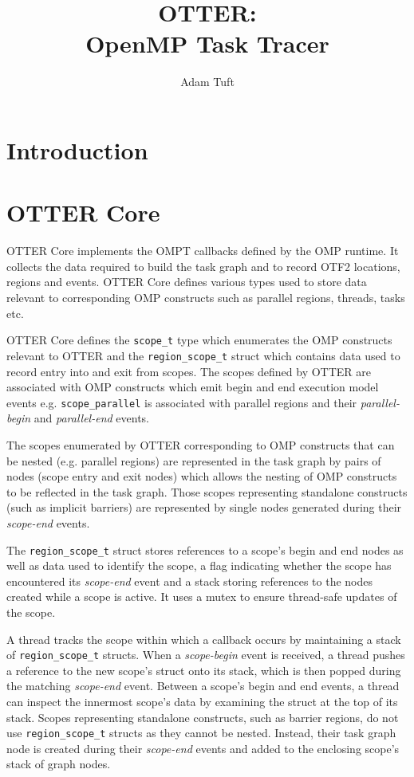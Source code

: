 \documentclass[11pt,a4paper]{article}
\title{OTTER:\\OpenMP Task Tracer}
\newcommand{\code}[1]{\texttt{#1} }
\begin{document}
\author{Adam Tuft}
\maketitle

\section{Introduction}

\section{OTTER Core}

OTTER Core implements the OMPT callbacks defined by the OMP runtime. It collects the data required to build the task graph and to record OTF2 locations, regions and events. OTTER Core defines various types used to store data relevant to corresponding OMP constructs such as parallel regions, threads, tasks etc.

OTTER Core defines the \code{scope\_t} type which enumerates the OMP constructs relevant to OTTER and the \code{region\_scope\_t} struct which contains data used to record entry into and exit from scopes. The scopes defined by OTTER are associated with OMP constructs which emit begin and end execution model events e.g. \code{scope\_parallel} is associated with parallel regions and their \emph{parallel-begin} and \emph{parallel-end} events.

The scopes enumerated by OTTER corresponding to OMP constructs that can be nested (e.g. parallel regions) are represented in the task graph by pairs of nodes (scope entry and exit nodes) which allows the nesting of OMP constructs to be reflected in the task graph. Those scopes representing standalone constructs (such as implicit barriers) are represented by single nodes generated during their \emph{scope-end} events.

The \code{region\_scope\_t} struct stores references to a scope's begin and end nodes as well as data used to identify the scope, a flag indicating whether the scope has encountered its \emph{scope-end} event and a stack storing references to the nodes created while a scope is active. It uses a mutex to ensure thread-safe updates of the scope.

A thread tracks the scope within which a callback occurs by maintaining a stack of \code{region\_scope\_t} structs. When a \emph{scope-begin} event is received, a thread pushes a reference to the new scope's struct onto its stack, which is then popped during the matching \emph{scope-end} event. Between a scope's begin and end events, a thread can inspect the innermost scope's data by examining the struct at the top of its stack. Scopes representing standalone constructs, such as barrier regions, do not use \code{region\_scope\_t} structs as they cannot be nested. Instead, their task graph node is created during their \emph{scope-end} events and added to the enclosing scope's stack of graph nodes.
\end{document}
